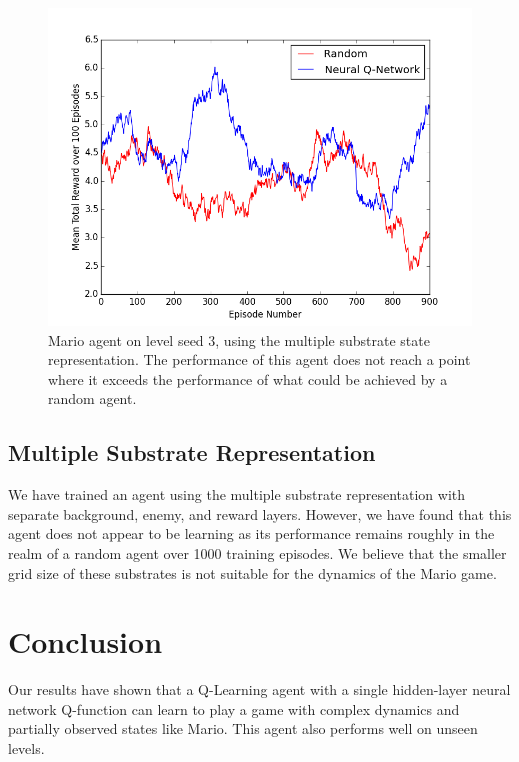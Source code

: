 \documentclass{article}
\begin{document}
  \begin{figure}
 \begin{center}
\includegraphics[scale=0.42]{seed3wSubstrates.png}
\caption{Mario agent on level seed 3, using the multiple substrate state representation. The performance of this agent does not reach a point where it exceeds the performance of what could be achieved by a random agent.}
\end{center}
\end{figure}
 
 \subsection{Multiple Substrate Representation}
 We have trained an agent using the multiple substrate representation with separate background, enemy, and reward layers. However, we have found that this agent does not appear to be learning as its performance remains roughly in the realm of a random agent over 1000 training episodes. We believe that the smaller grid size of these substrates is not suitable for the dynamics of the Mario game.
 
 \section{Conclusion}
 
Our results have shown that a Q-Learning agent with a single hidden-layer neural network Q-function can learn to play a game with complex dynamics and partially observed states like Mario. This agent also performs well on unseen levels. 
\end{document}

